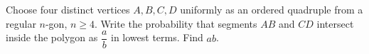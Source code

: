 Choose four distinct vertices $A,B,C,D$ uniformly as an ordered quadruple from a regular $n$-gon, $n\ge4$. Write the probability that segments $AB$ and $CD$ intersect inside the polygon as $\dfrac{a}{b}$ in lowest terms. Find $ab$.
